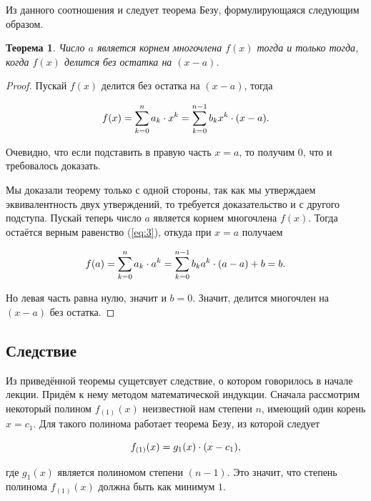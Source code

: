 \documentclass[12pt]{article}
\newtheorem{theorem}{Теорема}[section]
\begin{document}
\noindent Из данного соотношения и следует теорема Безу, формулирующаяся следующим образом.

\begin{theorem}
	Число $a$ является корнем многочлена $f(x)$ тогда и только тогда, когда $f(x)$ делится без остатка на $(x-a)$.
\end{theorem}

\begin{proof}
Пускай $f(x)$ делится без остатка на $(x-a)$, тогда 

\begin{equation}
f(x) = \sum_{k=0}^n{a_k \cdot x^k} = \sum_{k=0}^{n-1}{b_k x^k}\cdot \qty(x-a).
\end{equation}

\noindent Очевидно, что если подставить в правую часть $x=a$, то получим $0$, что и требовалось доказать. 

\par 
Мы доказали теорему только с одной стороны, так как мы утверждаем эквивалентность двух утверждений, то требуется доказательство и с другого подступа. Пускай теперь число $a$ является корнем многочлена $f(x)$. Тогда остаётся верным равенство (\ref{eq:3}), откуда при $x=a$ получаем

\begin{equation}
  f(a) = \sum_{k=0}^n{a_k \cdot a^k} = \sum_{k=0}^{n-1}{b_k a^k}\cdot \qty(a-a) + b = b.
\end{equation}

\noindent Но левая часть равна нулю, значит и $b = 0$. Значит, делится многочлен на $(x-a)$ без остатка.
\end{proof}

\subsection{Следствие}
Из приведённой теоремы сущетсвует следствие, о котором говорилось в начале лекции. Придём к нему методом математической индукции. Сначала рассмотрим некоторый полином $f_{(1)}(x)$ неизвестной нам степени $n$, имеющий один корень $x=c_1$. Для такого полинома работает теорема Безу, из которой следует

\begin{equation}
  f_{(1)}(x) = g_1(x)\cdot \qty(x-c_1),
\end{equation}

\noindent где $g_1(x)$ является полиномом степени $(n-1)$. Это значит, что степень полинома $f_{(1)}(x)$ должна быть как минимум $1$. 
\end{document}
